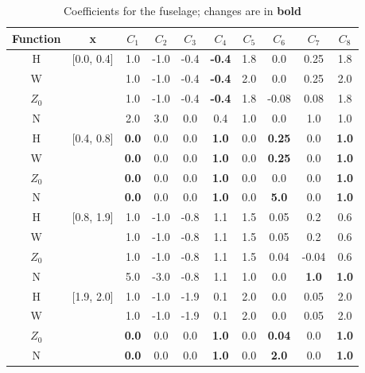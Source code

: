 \documentclass[journal]{new-aiaa}
\begin{document}
\begin{table}[ht]
\caption{Coefficients for the fuselage; changes are in \textbf{bold}}
\centering
\begin{tabular}{cccccccccc}
Function & x & $C_{1}$ & $C_{2}$ & $C_{3}$ & $C_{4}$ & $C_{5}$ & $C_{6}$ & $C_{7}$ & $C_{8}$ \\
\hline
H          & [0.0, 0.4]  & 1.0 & -1.0 & -0.4 & \textbf{-0.4} & 1.8 & 0.0    & 0.25 & 1.8 \\
W          &             & 1.0 & -1.0 & -0.4 & \textbf{-0.4} & 2.0 & 0.0    & 0.25 & 2.0 \\
$Z_{0}$ &                & 1.0 & -1.0 & -0.4 & \textbf{-0.4} & 1.8 & -0.08 & 0.08 & 1.8 \\
N           &            & 2.0 & 3.0  & 0.0  &              0.4  & 1.0 & 0.0    & 1.0   & 1.0 \\
\hline
H          & [0.4, 0.8]  & \textbf{0.0} & 0.0 & 0.0 & \textbf{1.0} & 0.0 & \textbf{0.25} & 0.0 & \textbf{1.0} \\
W          &             & \textbf{0.0} & 0.0 & 0.0 & \textbf{1.0} & 0.0 & \textbf{0.25} & 0.0 & \textbf{1.0} \\
$Z_{0}$ &                & \textbf{0.0} & 0.0 & 0.0 & \textbf{1.0} & 0.0 & 0.0               & 0.0 & \textbf{1.0} \\
N           &            & \textbf{0.0} & 0.0 & 0.0 & \textbf{1.0} & 0.0 & \textbf{5.0}   & 0.0 & \textbf{1.0} \\
\hline
H          & [0.8, 1.9]  & 1.0 & -1.0 & -0.8 & 1.1 & 1.5 & 0.05 & 0.2 & 0.6 \\
W          &             & 1.0 & -1.0 & -0.8 & 1.1 & 1.5 & 0.05 & 0.2 & 0.6 \\
$Z_{0}$ &                & 1.0 & -1.0 & -0.8 & 1.1 & 1.5 & 0.04 & -0.04 & 0.6 \\
N           &            & 5.0 & -3.0 & -0.8 & 1.1 & 1.0 & 0.0 & \textbf{1.0} & \textbf{1.0} \\
\hline
H          & [1.9, 2.0]  & 1.0 & -1.0 & -1.9 & 0.1 & 2.0 & 0.0 & 0.05 & 2.0 \\
W          &             & 1.0 & -1.0 & -1.9 & 0.1 & 2.0 & 0.0 & 0.05 & 2.0 \\
$Z_{0}$ &                & \textbf{0.0} & 0.0 & 0.0 & \textbf{1.0} & 0.0 & \textbf{0.04} & 0.0 & \textbf{1.0} \\
N           &            & \textbf{0.0} & 0.0 & 0.0 & \textbf{1.0} & 0.0 & \textbf{2.0} & 0.0 & \textbf{1.0} \\
\end{tabular}
\label{fuscoeff}
\end{table}
\end{document}
